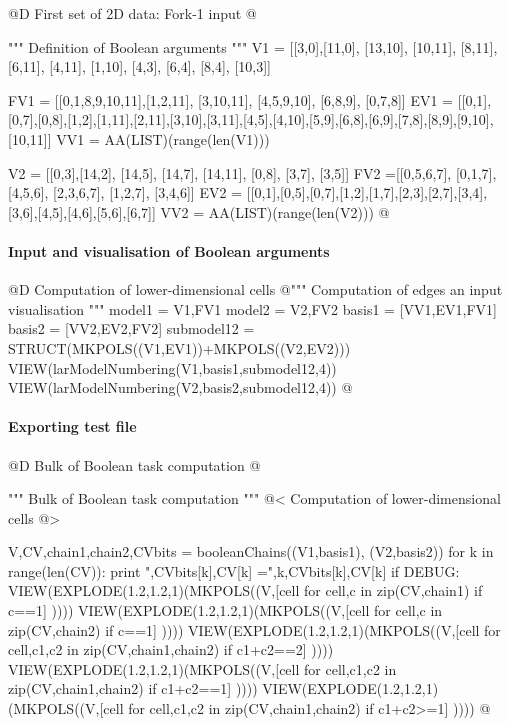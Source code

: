 \documentclass[11pt,oneside]{article}	%
\begin{document}
@D First set of 2D data: Fork-1 input
@{""" Definition of Boolean arguments """
V1 = [[3,0],[11,0], [13,10], [10,11], [8,11], [6,11], [4,11], [1,10], [4,3], [6,4], 
	[8,4], [10,3]]
	
FV1 = [[0,1,8,9,10,11],[1,2,11], [3,10,11], [4,5,9,10], [6,8,9], [0,7,8]]
EV1 = [[0,1],[0,7],[0,8],[1,2],[1,11],[2,11],[3,10],[3,11],[4,5],[4,10],[5,9],[6,8],[6,9],[7,8],[8,9],[9,10],[10,11]]
VV1 = AA(LIST)(range(len(V1)))

V2 = [[0,3],[14,2], [14,5], [14,7], [14,11], [0,8], [3,7], [3,5]]
FV2 =[[0,5,6,7], [0,1,7], [4,5,6], [2,3,6,7], [1,2,7], [3,4,6]]
EV2 = [[0,1],[0,5],[0,7],[1,2],[1,7],[2,3],[2,7],[3,4],[3,6],[4,5],[4,6],[5,6],[6,7]]
VV2 = AA(LIST)(range(len(V2)))
@}


\paragraph{Input and visualisation of Boolean arguments}

@D Computation of lower-dimensional cells
@{""" Computation of edges an input visualisation """
model1 = V1,FV1
model2 = V2,FV2
basis1 = [VV1,EV1,FV1]
basis2 = [VV2,EV2,FV2]
submodel12 = STRUCT(MKPOLS((V1,EV1))+MKPOLS((V2,EV2)))
VIEW(larModelNumbering(V1,basis1,submodel12,4))
VIEW(larModelNumbering(V2,basis2,submodel12,4))
@}

\paragraph{Exporting test file}

@D Bulk of Boolean task computation
@{""" Bulk of Boolean task computation """
@< Computation of lower-dimensional cells @>

V,CV,chain1,chain2,CVbits = booleanChains((V1,basis1), (V2,basis2))
for k in range(len(CV)):  print "\nk,CVbits[k],CV[k] =",k,CVbits[k],CV[k]
if DEBUG:
	VIEW(EXPLODE(1.2,1.2,1)(MKPOLS((V,[cell for cell,c in zip(CV,chain1) if c==1] ))))
	VIEW(EXPLODE(1.2,1.2,1)(MKPOLS((V,[cell for cell,c in zip(CV,chain2) if c==1] ))))
	VIEW(EXPLODE(1.2,1.2,1)(MKPOLS((V,[cell for cell,c1,c2 in zip(CV,chain1,chain2) if c1+c2==2] ))))
	VIEW(EXPLODE(1.2,1.2,1)(MKPOLS((V,[cell for cell,c1,c2 in zip(CV,chain1,chain2) if c1+c2==1] ))))
	VIEW(EXPLODE(1.2,1.2,1)(MKPOLS((V,[cell for cell,c1,c2 in zip(CV,chain1,chain2) if c1+c2>=1] ))))
@}
\end{document}
